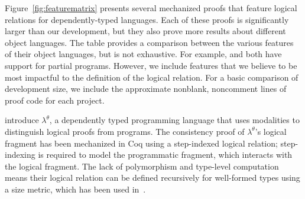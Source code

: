 \documentclass[\ifpublic nolinenum\else\fi,online,OA]{jfp}
\newcommand{\jc}[1]{}
\theoremstyle{definition}
\begin{document}
\jc{Missing from the table:
\begin{itemize}
  \item Altenkirch and Kaposi (2016) using QIITs, mentioned above (Agda);
    mechanization might be part of Kaposi's thesis (2016)
  \item prior work Chapman (2009), Type Theory should Eat Itself (Agda);
    possibly also his thesis (2008)
  \item Kipling by McBride (2010), mixing deep and shallow embedding
    using host conversion (Agda) to avoid the whole QIIT business
  \item Kaposi et al. (2019), Shallow Embedding of Type Theory (Agda),
    although at this point I'm not sure if this counts as having a syntax
\end{itemize}
}

Figure~\ref{fig:featurematrix} presents several mechanized proofs
that feature logical relations for dependently-typed languages.
Each of these proofs is significantly larger than our development, but they
also prove more results about different object languages.
The table provides a comparison between the various features of their
object languages, but is not exhaustive. For example,
\citet{casinghino:combining-proofs-programs} and
\citet{anand2014towards} both have support for partial
programs. However, we include features that we believe to be most
impactful to the definition of the logical relation.
For a basic comparison of development size, we include the approximate
nonblank, noncomment lines of proof code for each project.

\citet{casinghino:combining-proofs-programs} introduce $\lambda^\theta$,
a dependently typed programming language that uses modalities to distinguish
logical proofs from programs.
The consistency proof of $\lambda^\theta$'s logical fragment has been
mechanized in Coq using a step-indexed logical relation;
step-indexing is required to model the programmatic fragment, which
interacts with the logical fragment.
The lack of polymorphism and type-level computation means their
logical relation can be defined recursively for well-formed types using
a size metric, which has been used in~\citet{liu2023dependently}.
\end{document}
